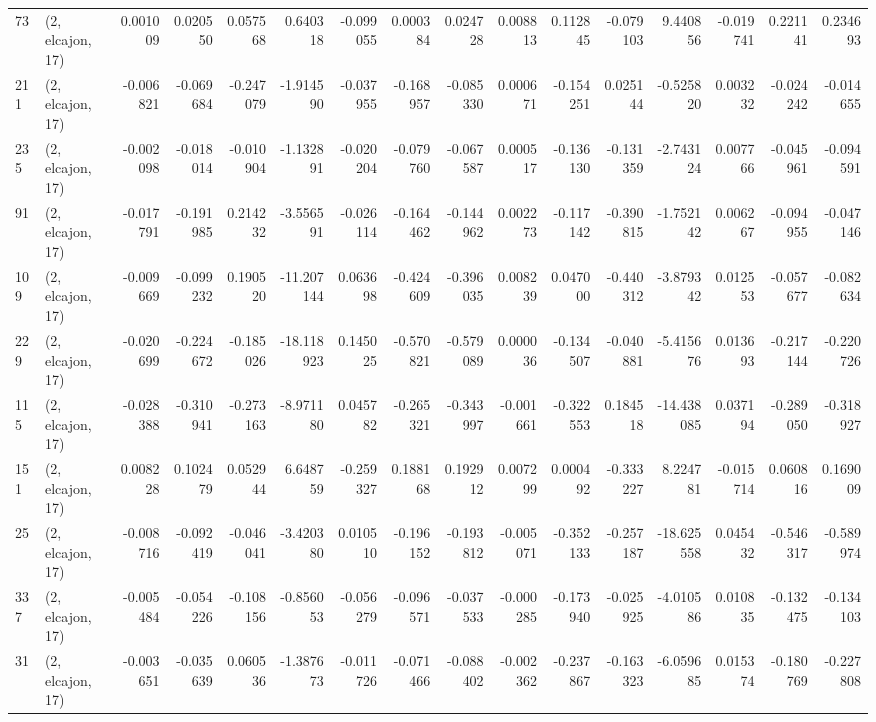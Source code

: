 \begin{tabular}{llrrrrrrrrrrrrrr}
73  &  (2, elcajon, 17) &   0.001009 &  0.020550 &  0.057568 &     0.640318 &  -0.099055 &   0.000384 &   0.024728 &  0.008813 &  0.112845 & -0.079103 &    9.440856 & -0.019741 &  0.221141 &  0.234693 \\
211 &  (2, elcajon, 17) &  -0.006821 & -0.069684 & -0.247079 &    -1.914590 &  -0.037955 &  -0.168957 &  -0.085330 &  0.000671 & -0.154251 &  0.025144 &   -0.525820 &  0.003232 & -0.024242 & -0.014655 \\
235 &  (2, elcajon, 17) &  -0.002098 & -0.018014 & -0.010904 &    -1.132891 &  -0.020204 &  -0.079760 &  -0.067587 &  0.000517 & -0.136130 & -0.131359 &   -2.743124 &  0.007766 & -0.045961 & -0.094591 \\
91  &  (2, elcajon, 17) &  -0.017791 & -0.191985 &  0.214232 &    -3.556591 &  -0.026114 &  -0.164462 &  -0.144962 &  0.002273 & -0.117142 & -0.390815 &   -1.752142 &  0.006267 & -0.094955 & -0.047146 \\
109 &  (2, elcajon, 17) &  -0.009669 & -0.099232 &  0.190520 &   -11.207144 &   0.063698 &  -0.424609 &  -0.396035 &  0.008239 &  0.047000 & -0.440312 &   -3.879342 &  0.012553 & -0.057677 & -0.082634 \\
229 &  (2, elcajon, 17) &  -0.020699 & -0.224672 & -0.185026 &   -18.118923 &   0.145025 &  -0.570821 &  -0.579089 &  0.000036 & -0.134507 & -0.040881 &   -5.415676 &  0.013693 & -0.217144 & -0.220726 \\
115 &  (2, elcajon, 17) &  -0.028388 & -0.310941 & -0.273163 &    -8.971180 &   0.045782 &  -0.265321 &  -0.343997 & -0.001661 & -0.322553 &  0.184518 &  -14.438085 &  0.037194 & -0.289050 & -0.318927 \\
151 &  (2, elcajon, 17) &   0.008228 &  0.102479 &  0.052944 &     6.648759 &  -0.259327 &   0.188168 &   0.192912 &  0.007299 &  0.000492 & -0.333227 &    8.224781 & -0.015714 &  0.060816 &  0.169009 \\
25  &  (2, elcajon, 17) &  -0.008716 & -0.092419 & -0.046041 &    -3.420380 &   0.010510 &  -0.196152 &  -0.193812 & -0.005071 & -0.352133 & -0.257187 &  -18.625558 &  0.045432 & -0.546317 & -0.589974 \\
337 &  (2, elcajon, 17) &  -0.005484 & -0.054226 & -0.108156 &    -0.856053 &  -0.056279 &  -0.096571 &  -0.037533 & -0.000285 & -0.173940 & -0.025925 &   -4.010586 &  0.010835 & -0.132475 & -0.134103 \\
31  &  (2, elcajon, 17) &  -0.003651 & -0.035639 &  0.060536 &    -1.387673 &  -0.011726 &  -0.071466 &  -0.088402 & -0.002362 & -0.237867 & -0.163323 &   -6.059685 &  0.015374 & -0.180769 & -0.227808 \\

\end{tabular}
